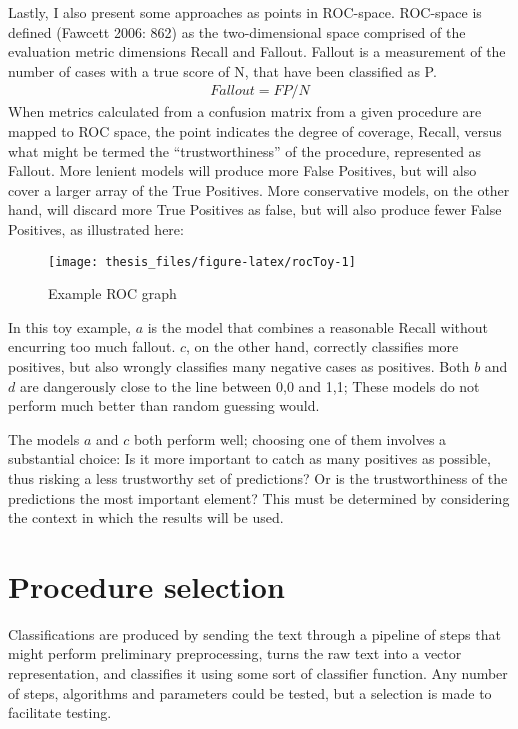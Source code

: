 \documentclass[12pt,twoside]{reedthesis}
\begin{document}
Lastly, I also present some approaches as points in ROC-space. ROC-space
is defined (Fawcett 2006: 862) as the two-dimensional space comprised of
the evaluation metric dimensions Recall and Fallout. Fallout is a
measurement of the number of cases with a true score of N, that have
been classified as P.
\begin{align*}
Fallout= FP / N
\end{align*}
When metrics calculated from a confusion matrix from a given procedure
are mapped to ROC space, the point indicates the degree of coverage,
Recall, versus what might be termed the ``trustworthiness'' of the
procedure, represented as Fallout. More lenient models will produce more
False Positives, but will also cover a larger array of the True
Positives. More conservative models, on the other hand, will discard
more True Positives as false, but will also produce fewer False
Positives, as illustrated here:
\begin{figure}

\texttt{[image: thesis\_files/figure-latex/rocToy-1]} \hfill{}

\caption{Example ROC graph}\label{fig:rocToy}
\end{figure}
In this toy example, \(a\) is the model that combines a reasonable
Recall without encurring too much fallout. \(c\), on the other hand,
correctly classifies more positives, but also wrongly classifies many
negative cases as positives. Both \(b\) and \(d\) are dangerously close
to the line between 0,0 and 1,1; These models do not perform much better
than random guessing would.

The models \(a\) and \(c\) both perform well; choosing one of them
involves a substantial choice: Is it more important to catch as many
positives as possible, thus risking a less trustworthy set of
predictions? Or is the trustworthiness of the predictions the most
important element? This must be determined by considering the context in
which the results will be used.

\section{Procedure selection}\label{procedure-selection}

Classifications are produced by sending the text through a pipeline of
steps that might perform preliminary preprocessing, turns the raw text
into a vector representation, and classifies it using some sort of
classifier function. Any number of steps, algorithms and parameters
could be tested, but a selection is made to facilitate testing.
\end{document}
